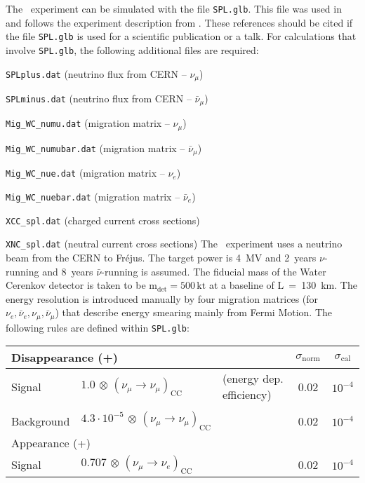 \begin{appendix}
The \SPL\ experiment can be simulated with the file {\tt SPL.glb}. This file was used in \cite{Campagne:2006yx}
and follows the experiment description from \cite{Mezzetto:2003mm, Campagne:2004wt}. These references
should be cited if the file {\tt SPL.glb} is used for a scientific publication or a talk. For calculations that
involve {\tt SPL.glb}, the following additional files are required: 
\bi
\item {\tt SPLplus.dat} (neutrino flux from CERN -- $\nu_\mu$)
\item {\tt SPLminus.dat} (neutrino flux from CERN -- $\bar{\nu}_\mu$)
\item {\tt Mig\_WC\_numu.dat} (migration matrix -- $\nu_\mu$)
\item {\tt Mig\_WC\_numubar.dat} (migration matrix -- $\bar{\nu}_\mu$)
\item {\tt Mig\_WC\_nue.dat} (migration matrix -- $\nu_e$)
\item {\tt Mig\_WC\_nuebar.dat} (migration matrix -- $\bar{\nu}_e$)
\item {\tt XCC\_spl.dat} (charged current cross sections)
\item {\tt XNC\_spl.dat} (neutral current cross sections)
\ei
The \SPL\ experiment uses a neutrino beam from the CERN to Fr\'{e}jus. The target power is 
4~MV and 2~years $\nu$-running and 8~years $\bar{\nu}$-running 
is assumed. The fiducial mass of the Water Cerenkov detector is taken to be 
$\mathrm{m_{det} = 500 \,kt}$ at a baseline of L~=~130~km. The energy resolution is introduced manually by
four migration matrices (for $\nu_e , \bar{\nu}_e ,\nu_{\mu} ,\bar{\nu}_\mu$) that describe energy smearing mainly
from Fermi Motion. The following rules are defined within {\tt SPL.glb}: 
\begin{center}
\begin{tabular}{|l|ll|c|c|}
\hline \hline
\multicolumn{3}{|l|}{Disappearance (+)} & $\sigma_\mathrm{norm}$ & $\sigma_\mathrm{cal}$ \\ \hline 
Signal & $1.0 \, \otimes \, (\nu_\mu\rightarrow\nu_\mu)_{\mathrm{CC}}$ & (energy dep. efficiency) & 0.02 & $10^{-4}$\\
 & &  & &\\
Background & $4.3\cdot 10^{-5} \, \otimes \, (\nu_\mu \rightarrow \nu_\mu)_\mathrm{CC}$ & & 0.02 & $10^{-4}$ \\ \hline \hline 
\multicolumn{3}{|l|}{Appearance (+)} &  & \\ \hline
Signal & $0.707 \, \otimes \, (\nu_\mu\rightarrow \nu_e)_\mathrm{CC}$ & & 0.02 & $10^{-4}$\\

\end{tabular}
\end{center}
\end{appendix}
